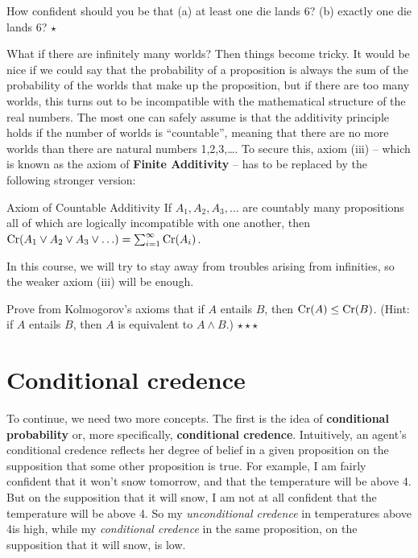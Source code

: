 \begin{exercise}
  How confident should you be that (a) at least one die lands 6?
  (b) exactly one die lands 6? $\star$
\end{exercise}

What if there are infinitely many worlds? Then things become
tricky. It would be nice if we could say that the probability of a
proposition is always the sum of the probability of the worlds that
make up the proposition, but if there are too many worlds, this turns
out to be incompatible with the mathematical structure of the real
numbers. The most one can safely assume is that the additivity
principle holds if the number of worlds is ``countable'', meaning that
there are no more worlds than there are natural numbers
1,2,3,\ldots. To secure this, axiom (iii) -- which is known as the
axiom of \textbf{Finite Additivity} -- has to be replaced by the
following stronger version:
%
\begin{genericthm}{Axiom of Countable Additivity} 
  If $A_1, A_2, A_3, \ldots$ are countably many propositions all of
  which are logically incompatible with one another, then $\text{Cr}(A_1
  \lor A_2 \lor A_3 \lor \ldots) = \sum_{i=1}^\infty \text{Cr}(A_i)$.
\end{genericthm}
%
In this course, we will try to stay away from troubles arising from
infinities, so the weaker axiom (iii) will be enough.

\begin{exercise}
  Prove from Kolmogorov's axioms that if $A$ entails $B$, then $\text{Cr}(A)
  \leq \text{Cr}(B)$. (Hint: if $A$ entails $B$, then $A$ is equivalent to
  $A \land B$.) $\star\star\star$
\end{exercise}


\section{Conditional credence}\label{sec:conditional}

To continue, we need two more concepts. The first is the idea of
\textbf{conditional probability} or, more specifically,
\textbf{conditional credence}.  Intuitively, an agent's conditional
credence reflects her degree of belief in a given proposition on the
supposition that some other proposition is true. For example, I am
fairly confident that it won't snow tomorrow, and that the temperature
will be above 4\celsius. But on the supposition that it will snow, I
am not at all confident that the temperature will be above
4\celsius. So my \emph{unconditional credence} in temperatures above
4\celsius is high, while my \emph{conditional credence} in the same
proposition, on the supposition that it will snow, is low.

